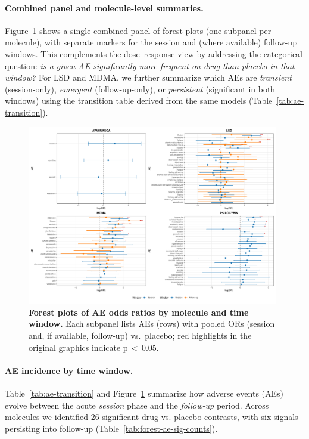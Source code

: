 \paragraph{Combined panel and molecule-level summaries.}
Figure~\ref{fig:forest-combined} shows a single combined panel of forest plots (one subpanel per molecule), with separate markers for the session and (where available) follow-up windows. This complements the dose–response view by addressing the categorical question: \emph{is a given AE significantly more frequent on drug than placebo in that window?} For LSD and MDMA, we further summarize which AEs are \emph{transient} (session-only), \emph{emergent} (follow-up-only), or \emph{persistent} (significant in both windows) using the transition table derived from the same models (Table~\ref{tab:ae-transition}).

\begin{figure}[htb]
  \centering
  \includegraphics[width=0.98\textwidth]{figures/forest_combined_all_molecules.pdf}
  \caption{\textbf{Forest plots of AE odds ratios by molecule and time window.}
  Each subpanel lists AEs (rows) with pooled ORs (session and, if available, follow-up) vs.\ placebo; red highlights in the original graphics indicate p\,$<\,$0.05.}
  \label{fig:forest-combined}
\end{figure}




\paragraph{AE incidence by time window.}
Table~\ref{tab:ae-transition} and Figure~\ref{fig:forest-combined} summarize how adverse events (AEs) evolve between the acute \textit{session} phase and the \textit{follow-up} period.
Across molecules we identified 26 significant drug-vs.-placebo contrasts, with six signals persisting into follow-up (Table~\ref{tab:forest-ae-sig-counts}).

